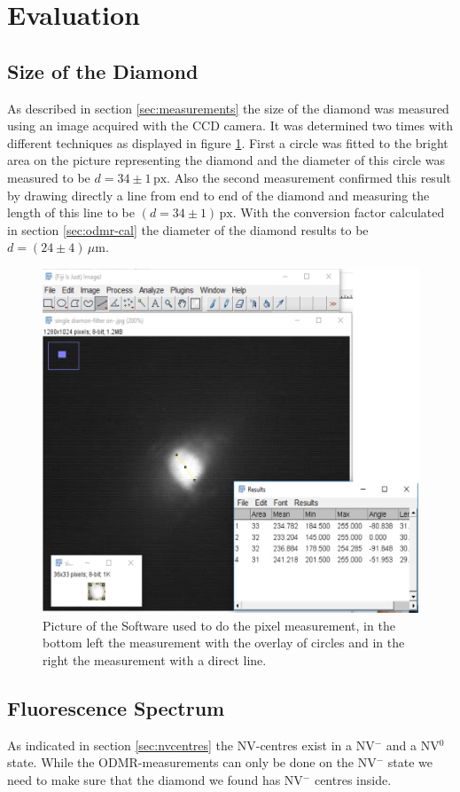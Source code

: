 \section{Evaluation}
\subsection{Size of the Diamond}
\label{sec:size}

As described in section \ref{sec:measurements} the size of the diamond was measured using an image acquired with the CCD camera. It was determined two times with different techniques as displayed in figure \ref{fig:diasize4}. First a circle was fitted to the bright area on the picture representing the diamond and the diameter of this circle was measured to be $d=34\pm1\,\mathrm{px}$. Also the second measurement confirmed this result by drawing directly a line from end to end of the diamond and measuring the length of this line to be $(d=34\pm1)\,\mathrm{px}$. With the conversion factor calculated in section \ref{sec:odmr-cal} the diameter of the diamond results to be $d=(24\pm4)\,\mu\mathrm{m}$.

\begin{figure}[hb]
	\centering
	\includegraphics[width=0.7\linewidth]{../figures/Diasize4}
	\caption[Measuring of the size of the diamond]{Picture of the Software used to do the pixel measurement, in the bottom left the measurement with the overlay of circles and in the right the measurement with a direct line.}
	\label{fig:diasize4}
\end{figure}


\subsection{Fluorescence Spectrum}
As indicated in section \ref{sec:nvcentres} the NV-centres exist in a NV$^-$ and a NV$^0$ state. While the ODMR-measurements can only be done on the NV$^-$ state we need to make sure that the diamond we found has NV$^-$ centres inside.\\

